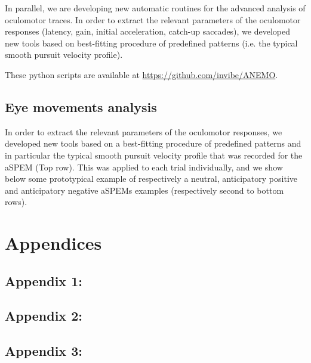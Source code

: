 \documentclass[profile,final,english, draft]{article}%
\begin{document}
In parallel, we are developing new automatic routines for the advanced analysis of oculomotor traces. In order to extract the relevant parameters of the oculomotor responses (latency, gain, initial acceleration, catch-up saccades), we developed new tools based on best-fitting procedure of predefined patterns (i.e. the typical smooth pursuit velocity profile).

These python scripts are available at \url{https://github.com/invibe/ANEMO}.


\subsection{Eye movements analysis}

In order to extract the relevant parameters of the oculomotor responses, we developed new tools based on a best-fitting procedure of predefined patterns and in particular the typical smooth pursuit velocity profile that was recorded for the aSPEM (Top row). This was applied to each trial individually, and we show below some prototypical example of respectively a neutral, anticipatory positive and anticipatory negative aSPEMs examples (respectively second to bottom rows).
\section{Appendices}
\subsection{Appendix 1: }
\label{app1}
\subsection{Appendix 2: }
\label{app2}
\subsection{Appendix 3: }
\label{app3}

{\tiny
\printbibliography
}
\end{document}
